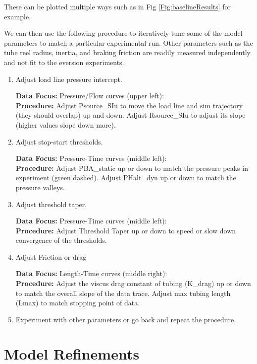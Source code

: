 \documentclass[letterpaper]{article}
\begin{document}
These can be plotted multiple ways such as in Fig \ref{Fig:baselineResults} for example.

We can then use the following procedure to iteratively tune some of the  model  parameters to match a
particular experimental run.   Other parameters such as the tube reel radius, inertia, and braking
friction are readily measured independently \cite{Andy Papers}  and not fit to the eversion experiments.

\begin{enumerate}
    \item  Adjust load line pressure intercept.

    {\bf Data Focus: } Pressure/Flow curves (upper left):\\
    {\bf Procedure: } Adjust Psource\_SIu to move the load line and sim trajectory (they should overlap)
    up and down.  Adjust Rsource\_SIu to adjust its slope (higher values slope down more).

    \item Adjust stop-start thresholds.

     {\bf Data Focus: } Pressure-Time curves (middle left):\\
    {\bf Procedure: } Adjust PBA\_static up or down to match the pressure peaks in experiment (green dashed).
    Adjust PHalt\_dyn  up or down to match the pressure valleys.

    \item Adjust threshold taper.

     {\bf Data Focus: } Pressure-Time curves (middle left):\\
    {\bf Procedure: } Adjust Threshold Taper up or down to speed or slow down convergence of the thresholds.

    \item Adjust Friction or drag

     {\bf Data Focus: } Length-Time curves (middle right):\\
    {\bf Procedure: } Adjust the viscus drag constant of tubing (K\_drag) up or down to match the overall slope
    of the data trace.
    Adjust max tubing length (Lmax) to match stopping point of data.

    \item Experiment with other parameters or go back and repeat the procedure.

\end{enumerate}


\section{Model Refinements}
\end{document}
